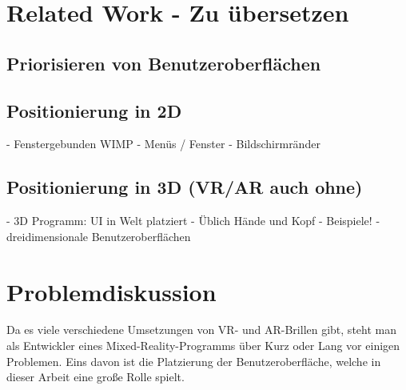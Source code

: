 \documentclass[a4paper]{scrartcl}
\begin{document}
	\section{Related Work - Zu übersetzen}
	
	\subsection{Priorisieren von Benutzeroberflächen}
	
	\subsection{Positionierung in 2D}
	- Fenstergebunden WIMP
	- Menüs / Fenster
	- Bildschirmränder
	
	\subsection{Positionierung in 3D (VR/AR auch ohne)}
	- 3D Programm: UI in Welt platziert
	- Üblich Hände und Kopf 
	- Beispiele!
	- dreidimensionale Benutzeroberflächen
	
	\section{Problemdiskussion}
	Da es viele verschiedene Umsetzungen von VR- und AR-Brillen gibt, steht man als Entwickler eines Mixed-Reality-Programms über Kurz oder Lang vor einigen Problemen. Eins davon ist die Platzierung der Benutzeroberfläche, welche in dieser Arbeit eine große Rolle spielt. 
	
	
\end{document}
